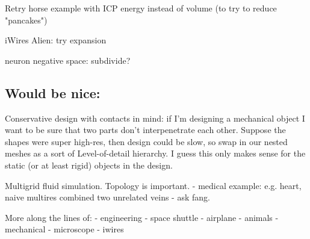 Retry horse example with ICP energy instead of volume (to try to reduce
"pancakes")

iWires Alien: try expansion 

neuron negative space: subdivide?

\subsection{Would be nice:}

Conservative design with contacts in mind: if I'm designing a mechanical object
I want to be sure that two parts don't interpenetrate each other. Suppose the
shapes were super high-res, then design could be slow, so swap in our nested
meshes as a sort of Level-of-detail hierarchy. I guess this only makes sense
for the static (or at least rigid) objects in the design.

Multigrid fluid simulation. Topology is important.
  - medical example: e.g. heart, naive multires combined two unrelated veins
  - ask fang.

More along the lines of:
  - engineering
    - space shuttle
    - airplane
  - animals
  - mechanical
    - microscope
    - iwires
